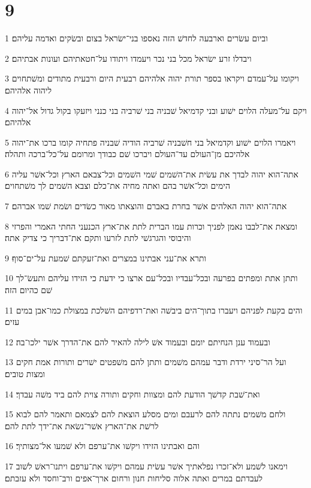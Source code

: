 \chapter{9}

\par 1 וביום עשׂרים וארבעה לחדשׁ הזה נאספו בני־ישׂראל בצום ובשׂקים ואדמה עליהם׃
\par 2 ויבדלו זרע ישׂראל מכל בני נכר ויעמדו ויתודו על־חטאתיהם ועונות אבתיהם׃
\par 3 ויקומו על־עמדם ויקראו בספר תורת יהוה אלהיהם רבעית היום ורבעית מתודים ומשׁתחוים ליהוה אלהיהם׃
\par 4 ויקם על־מעלה הלוים ישׁוע ובני קדמיאל שׁבניה בני שׁרביה בני כנני ויזעקו בקול גדול אל־יהוה אלהיהם׃
\par 5 ויאמרו הלוים ישׁוע וקדמיאל בני חשׁבניה שׁרביה הודיה שׁבניה פתחיה קומו ברכו את־יהוה אלהיכם מן־העולם עד־העולם ויברכו שׁם כבודך ומרומם על־כל־ברכה ותהלה׃
\par 6 אתה־הוא יהוה לבדך את עשׂית את־השׁמים שׁמי השׁמים וכל־צבאם הארץ וכל־אשׁר עליה הימים וכל־אשׁר בהם ואתה מחיה את־כלם וצבא השׁמים לך משׁתחוים׃
\par 7 אתה־הוא יהוה האלהים אשׁר בחרת באברם והוצאתו מאור כשׂדים ושׂמת שׁמו אברהם׃
\par 8 ומצאת את־לבבו נאמן לפניך וכרות עמו הברית לתת את־ארץ הכנעני החתי האמרי והפרזי והיבוסי והגרגשׁי לתת לזרעו ותקם את־דבריך כי צדיק אתה׃
\par 9 ותרא את־עני אבתינו במצרים ואת־זעקתם שׁמעת על־ים־סוף׃
\par 10 ותתן אתת ומפתים בפרעה ובכל־עבדיו ובכל־עם ארצו כי ידעת כי הזידו עליהם ותעשׂ־לך שׁם כהיום הזה׃
\par 11 והים בקעת לפניהם ויעברו בתוך־הים ביבשׁה ואת־רדפיהם השׁלכת במצולת כמו־אבן במים עזים׃
\par 12 ובעמוד ענן הנחיתם יומם ובעמוד אשׁ לילה להאיר להם את־הדרך אשׁר ילכו־בה׃
\par 13 ועל הר־סיני ירדת ודבר עמהם משׁמים ותתן להם משׁפטים ישׁרים ותורות אמת חקים ומצות טובים׃
\par 14 ואת־שׁבת קדשׁך הודעת להם ומצוות וחקים ותורה צוית להם ביד משׁה עבדך׃
\par 15 ולחם משׁמים נתתה להם לרעבם ומים מסלע הוצאת להם לצמאם ותאמר להם לבוא לרשׁת את־הארץ אשׁר־נשׂאת את־ידך לתת להם׃
\par 16 והם ואבתינו הזידו ויקשׁו את־ערפם ולא שׁמעו אל־מצותיך׃
\par 17 וימאנו לשׁמע ולא־זכרו נפלאתיך אשׁר עשׂית עמהם ויקשׁו את־ערפם ויתנו־ראשׁ לשׁוב לעבדתם במרים ואתה אלוה סליחות חנון ורחום ארך־אפים ורב־וחסד ולא עזבתם׃
